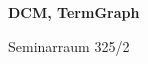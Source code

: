 \documentclass[a4paper]{article}
\begin{document}
\printGenericVSLHeader
\begin{center}
\begin{vsltext}{3cm}{4cm}

   \vspace{0.5cm} 

    \textbf{DCM, TermGraph} 

    \vspace{1.5cm}

    Seminarraum 325/2

\end{vsltext}

\end{center}
\end{document}
